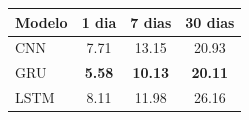 \begin{tabular}{l|ccc}
\hline
\textbf{Modelo} & \textbf{1 dia} & \textbf{7 dias} & \textbf{30 dias} \\
\hline
CNN & 7.71 & 13.15 & 20.93 \\
GRU & \textbf{5.58} & \textbf{10.13} & \textbf{20.11} \\
LSTM & 8.11 & 11.98 & 26.16 \\
\hline
\end{tabular}